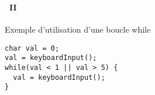 \begin{frame}[containsverbatim]
  \frametitle{\secname}
  \framesubtitle{\subsecname~II}

  \begin{exampleblock}{Exemple d'utilisation d'une boucle while}  
    \begin{verbatim}
char val = 0;
val = keyboardInput();
while(val < 1 || val > 5) {
  val = keyboardInput();
}\end{verbatim}
  \end{exampleblock}
\end{frame}


